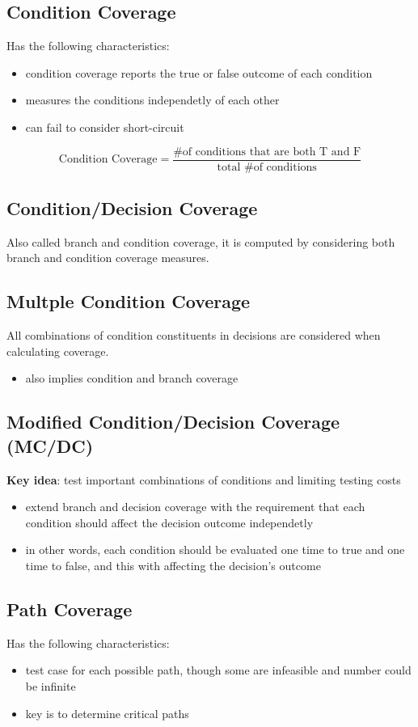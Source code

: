 \documentclass[11pt]{article}
\begin{document}
\subsection{Condition Coverage}
\label{sec:orgf0ba0d8}
Has the following characteristics:
\begin{itemize}
\item condition coverage reports the true or false outcome of each condition
\item measures the conditions independetly of each other
\item can fail to consider short-circuit
\end{itemize}
$$
        \text{Condition Coverage} =
        \frac{\text{\# of conditions that are both T and F}}{\text{total \# of conditions}}
$$
\subsection{Condition/Decision Coverage}
\label{sec:org21ac2ad}
Also called branch and condition coverage,
it is computed by considering both branch and condition coverage measures.
\subsection{Multple Condition Coverage}
\label{sec:org4511c63}
All combinations of condition constituents in decisions are considered when calculating coverage.
\begin{itemize}
\item also implies condition and branch coverage
\end{itemize}
\subsection{Modified Condition/Decision Coverage (MC/DC)}
\label{sec:orgecea819}
\textbf{Key idea}: test important combinations of conditions and limiting testing costs
\begin{itemize}
\item extend branch and decision coverage with the requirement that each condition should affect
the decision outcome independetly
\item in other words, each condition should be evaluated one time to true and one time to false,
and this with affecting the decision's outcome
\end{itemize}
\subsection{Path Coverage}
\label{sec:orgc6a77cb}
Has the following characteristics:
\begin{itemize}
\item test case for each possible path, though some are infeasible and number could be infinite
\item key is to determine critical paths
\end{itemize}
\end{document}
